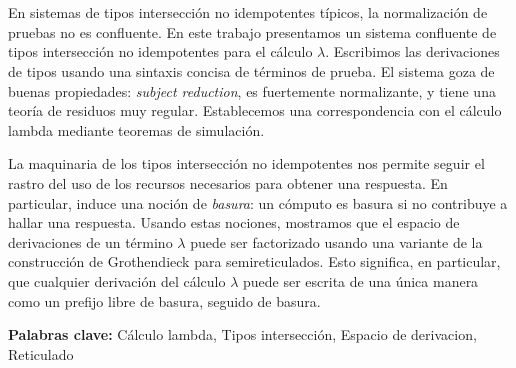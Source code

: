 \section*{}
En sistemas de tipos intersección no idempotentes típicos, la normalización de pruebas no es confluente.
En este trabajo presentamos un sistema confluente de tipos intersección no idempotentes para el cálculo $\lambda$.
Escribimos las derivaciones de tipos usando una sintaxis concisa de términos de prueba.
El sistema goza de buenas propiedades: \emph{subject reduction}, es fuertemente normalizante, y tiene una teoría de
residuos muy regular.
Establecemos una correspondencia con el cálculo lambda mediante teoremas de simulación.

La maquinaria de los tipos intersección no idempotentes nos permite seguir el rastro del uso de los recursos
necesarios para obtener una respuesta.
En particular, induce una noción de \textit{basura}: un cómputo es basura si no contribuye a hallar una respuesta.
Usando estas nociones, mostramos que el espacio de derivaciones de un término $\lambda$ puede ser factorizado
usando una variante de la construcción de Grothendieck para semireticulados.
Esto significa, en particular, que cualquier derivación del cálculo $\lambda$ puede ser escrita
de una única manera como un prefijo libre de basura, seguido de basura.

\vspace{2cm}
\noindent
\textbf{Palabras clave:} Cálculo lambda, Tipos intersección, Espacio de derivacion, Reticulado
